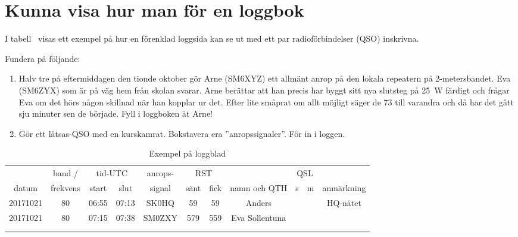 \section{Kunna visa hur man för en loggbok}

I tabell~ visas ett exempel på hur en förenklad loggsida kan
se ut med ett par radioförbindelser (QSO) inskrivna.

Fundera på följande:
\begin{enumerate}
\item Halv tre på eftermiddagen den tionde oktober gör Arne (SM6XYZ)
  ett allmänt anrop på den lokala repeatern på 2-metersbandet.
  Eva (SM6ZYX) som är på väg hem från skolan svarar.
  Arne berättar att han precis har byggt sitt nya slutsteg på \qty{25}{\watt}
  färdigt och frågar Eva om det hörs någon skillnad när han kopplar ur det.
  Efter lite småprat om allt möjligt säger de 73 till varandra och då har det
  gått sju minuter sen de började.
  Fyll i loggboken åt Arne!
\item Gör ett låtsas-QSO med en kurskamrat.
  Bokstavera era ''anropssignaler''.
  För in i loggen.
\end{enumerate}

\begin{table*}[b]
  \qquad
  \begin{tabular}{|c|c|c|c|c|c|c|c|c|c|c|}
    \hline
    & band / & \multicolumn{2}{|c|}{tid-UTC} & anrops- & \multicolumn{2}{|c|}{RST} & &
                                                                                       \multicolumn{2}{|c|}{QSL} & \\
    datum & frekvens & start & slut & signal & sänt & fick & namn och QTH & s & m & anmärkning \\
    \hline
    \hline
    20171021 & 80 & 06:55 & 07:13 & SK0HQ & 59 & 59 & Anders & & & HQ-nätet \\
    \hline
    20171021 & 80 & 07:15 & 07:38 & SM0ZXY & 579 & 559 & Eva Sollentuna & & & \\
    \hline
    & & & & & & & & & & \\
    \hline
    & & & & & & & & & & \\
    \hline
  \end{tabular}
  \caption{Exempel på loggblad}
  \label{tab:loggblad}
\end{table*}
